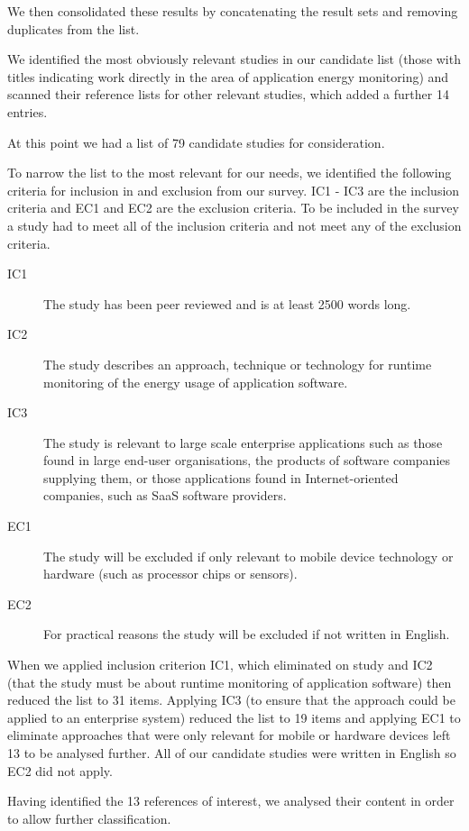 We then consolidated these results by concatenating the result sets and removing duplicates from the list.

We identified the most obviously relevant studies in our candidate list (those with titles indicating work directly in the area of application energy monitoring) and scanned their reference lists for other relevant studies, which added a further 14 entries.

At this point we had a list of 79 candidate studies for consideration.

To narrow the list to the most relevant for our needs, we identified the following criteria for inclusion in and exclusion from our survey.  IC1 - IC3 are the inclusion criteria and EC1 and EC2 are the exclusion criteria.  To be included in the survey a study had to meet all of the inclusion criteria and not meet any of the exclusion criteria.

\begin{description}
	\item[IC1] The study has been peer reviewed and is at least 2500 words long.
	\item[IC2] The study describes an approach, technique or technology for runtime monitoring of the energy usage of application software.
	\item[IC3] The study is relevant to large scale enterprise applications such as those found in large end-user organisations, the products of software companies supplying them, or those applications found in Internet-oriented companies, such as SaaS software providers.
	\item[EC1] The study will be excluded if only relevant to mobile device technology or hardware (such as processor chips or sensors).
	\item[EC2] For practical reasons the study will be excluded if not written in English.
\end{description}

When we applied inclusion criterion IC1, which eliminated on study and IC2 (that the study must be about runtime monitoring of application software) then reduced the list to 31 items.  Applying IC3 (to ensure that the approach could be applied to an enterprise system) reduced the list to 19 items and applying EC1 to eliminate approaches that were only relevant for mobile or hardware devices left 13 to be analysed further.  All of our candidate studies were written in English so EC2 did not apply.

Having identified the 13 references of interest, we analysed their content in order to allow further classification.  

